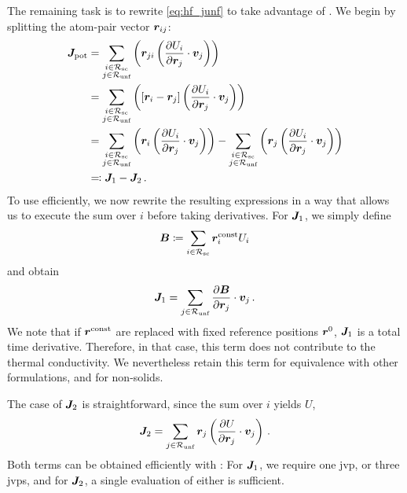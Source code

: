The remaining task is to rewrite \cref{eq:hf_junf} to take advantage of \ad. We begin by splitting the atom-pair vector $\boldsymbol{r}_{ij}$:
\begin{align}
	\boldsymbol{J}_\text{pot} &= \sum_{\substack{i \in \mathcal{R_{\text{sc}}} \\ j \in \mathcal{R_{\text{unf}}}}} \left(\boldsymbol{r}_{ji} \left(\frac{\partial U_{i}}{\partial \boldsymbol{r}_{j}} \cdot \boldsymbol{v}_j\right) \right) \\
	&= \sum_{\substack{i \in \mathcal{R_{\text{sc}}} \\ j \in \mathcal{R_{\text{unf}}}}} \left(\left[\boldsymbol{r}_{i} - \boldsymbol{r}_{j} \right] \left(\frac{\partial U_{i}}{\partial \boldsymbol{r}_{j}} \cdot \boldsymbol{v}_j\right) \right) \\
	&=  \sum_{\substack{i \in \mathcal{R_{\text{sc}}} \\ j \in \mathcal{R_{\text{unf}}}}} \left(\boldsymbol{r}_{i} \left(\frac{\partial U_{i}}{\partial \boldsymbol{r}_{j}} \cdot \boldsymbol{v}_j\right) \right) 
	-  \sum_{\substack{i \in \mathcal{R_{\text{sc}}} \\ j \in \mathcal{R_{\text{unf}}}}} \left(\boldsymbol{r}_{j} \left(\frac{\partial U_{i}}{\partial \boldsymbol{r}_{j}} \cdot \boldsymbol{v}_j\right) \right) \\
	&\eqqcolon \boldsymbol{J}_1 - \boldsymbol{J}_2 \, .
\end{align}
To use \ad efficiently, we now rewrite the resulting expressions in a way that allows us to execute the sum over $i$ before taking derivatives.
For $\boldsymbol{J}_1$, we simply define
\begin{equation}
	\boldsymbol{B} \coloneqq \sum_{i \in \mathcal{R_{\text{sc}}}} \boldsymbol{r}^{\text{const}}_i U_i
\end{equation}
and obtain
\begin{equation}
	\boldsymbol{J}_1 = \sum_{j \in \mathcal{R_{\text{unf}}}} \frac{\partial \boldsymbol{B}}{\partial \boldsymbol{r}_j} \cdot \boldsymbol{v}_j \, .
\end{equation}
We note that if $\boldsymbol{r}^{\text{const}}$ are replaced with fixed reference positions $\boldsymbol{r}^0$, $\boldsymbol{J}_1$ is a total time derivative. Therefore, in that case, this term does not contribute to the thermal conductivity. We nevertheless retain this term for equivalence with other formulations, and for non-solids.

The case of $\boldsymbol{J}_2$ is straightforward, since the sum over $i$ yields $U$,
\begin{equation}
	\boldsymbol{J}_2 = \sum_{j \in \mathcal{R_{\text{unf}}}} \boldsymbol{r}_j \left(  \frac{\partial U_{}}{\partial \boldsymbol{r}_{j}} \cdot \boldsymbol{v}_j \right) \, .
\end{equation}
Both terms can be obtained efficiently with \ad: For $\boldsymbol{J}_1$, we require one \gls{jvp}, or three \glspl{jvp}, and for $\boldsymbol{J}_2$, a single evaluation of either is sufficient.


